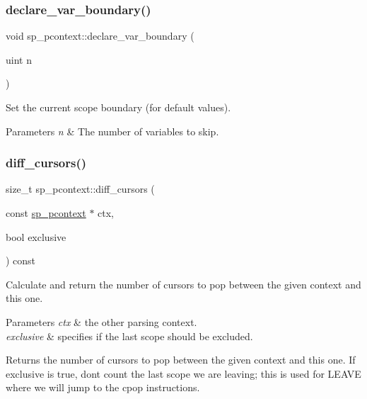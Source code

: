 \subsubsection{\texorpdfstring{declare\+\_\+var\+\_\+boundary()}{declare\_var\_boundary()}}
{\footnotesize\ttfamily void sp\+\_\+pcontext\+::declare\+\_\+var\+\_\+boundary (\begin{DoxyParamCaption}\item[{uint}]{n }\end{DoxyParamCaption})\hspace{0.3cm}{\ttfamily [inline]}}

Set the current scope boundary (for default values).


\begin{DoxyParams}{Parameters}
{\em n} & The number of variables to skip. \\
\hline
\end{DoxyParams}
\mbox{\label{classsp__pcontext_a1bed00024e865ddb21bfb40bd3383d70}} 
\subsubsection{\texorpdfstring{diff\+\_\+cursors()}{diff\_cursors()}}
{\footnotesize\ttfamily size\+\_\+t sp\+\_\+pcontext\+::diff\+\_\+cursors (\begin{DoxyParamCaption}\item[{const \mbox{\hyperlink{classsp__pcontext}{sp\+\_\+pcontext}} $\ast$}]{ctx,  }\item[{bool}]{exclusive }\end{DoxyParamCaption}) const}

Calculate and return the number of cursors to pop between the given context and this one.


\begin{DoxyParams}{Parameters}
{\em ctx} & the other parsing context. \\
\hline
{\em exclusive} & specifies if the last scope should be excluded.\\
\hline
\end{DoxyParams}
\begin{DoxyReturn}{Returns}
the number of cursors to pop between the given context and this one. If \textquotesingle{}exclusive\textquotesingle{} is true, don\textquotesingle{}t count the last scope we are leaving; this is used for L\+E\+A\+VE where we will jump to the cpop instructions. 
\end{DoxyReturn}
\mbox{\label{classsp__pcontext_ae47ee327ab468137d802f15dafe35206}} 
